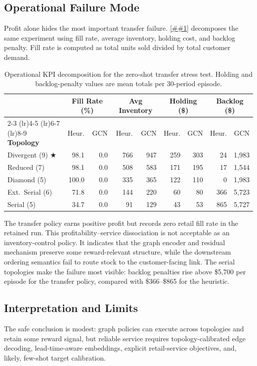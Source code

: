 \documentclass[10pt,a4paper]{article}
\providecommand{\Cref}[1]{\ref{##1}}
\begin{document}
\subsection{Operational Failure Mode}

Profit alone hides the most important transfer failure.
\Cref{tab:transfer_kpis} decomposes the same experiment using fill
rate, average inventory, holding cost, and backlog penalty.  Fill rate
is computed as total units sold divided by total customer demand.

\begin{table}[!htbp]
\centering
\caption[Operational KPI decomposition for topology transfer.]{%
  Operational KPI decomposition for the zero-shot transfer stress test.
  Holding and backlog-penalty values are mean totals per 30-period episode.}
\label{tab:transfer_kpis}
\small
\renewcommand{\arraystretch}{1.05}
\begin{tabular}{@{} l rr rr rr rr @{}}
\toprule
& \multicolumn{2}{c}{\textbf{Fill Rate (\%)}}
& \multicolumn{2}{c}{\textbf{Avg Inventory}}
& \multicolumn{2}{c}{\textbf{Holding (\$)}}
& \multicolumn{2}{c}{\textbf{Backlog (\$)}} \\
\cmidrule(lr){2-3} \cmidrule(lr){4-5} \cmidrule(lr){6-7} \cmidrule(lr){8-9}
\textbf{Topology} & Heur. & GCN & Heur. & GCN & Heur. & GCN & Heur. & GCN \\
\midrule
\rowcolor{lightgray}
Divergent (9) $\bigstar$
  & 98.1 &  0.0 &  766 &  947 &  259 & 303 &    24 & 1{,}983 \\
Reduced (7)
  & 98.1 &  0.0 &  508 &  583 &  171 & 195 &    17 & 1{,}544 \\
\rowcolor{lightgray}
Diamond (5)
  & 100.0 & 0.0 &  335 &  365 &  122 & 110 &     0 & 1{,}983 \\
Ext.\ Serial (6)
  & 71.8 &  0.0 &  144 &  220 &   60 &  80 &   366 & 5{,}723 \\
\rowcolor{lightgray}
Serial (5)
  & 34.7 &  0.0 &   91 &  129 &   43 &  53 &   865 & 5{,}727 \\
\bottomrule
\end{tabular}
\end{table}

The transfer policy earns positive profit but records zero retail fill
rate in the retained run.  This profitability--service dissociation is
not acceptable as an inventory-control policy.  It indicates that the
graph encoder and residual mechanism preserve some reward-relevant
structure, while the downstream ordering semantics fail to route stock
to the customer-facing link.  The serial topologies make the failure
most visible: backlog penalties rise above \$5{,}700 per episode for
the transfer policy, compared with \$366--\$865 for the heuristic.

\subsection{Interpretation and Limits}

The safe conclusion is modest: graph policies can execute across
topologies and retain some reward signal, but reliable service requires
topology-calibrated edge decoding, lead-time-aware embeddings, explicit
retail-service objectives, and, likely, few-shot target calibration.
\end{document}
